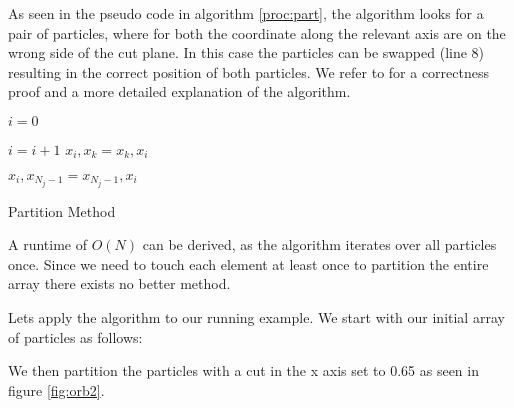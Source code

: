 \documentclass[]{article}
\begin{document}
As seen in the pseudo code in algorithm \ref{proc:part}, the algorithm looks for a pair of particles, where for both the coordinate along the relevant axis are  on the wrong side of the cut plane. In this case the particles can be swapped (line 8) resulting in the correct position of both particles. We refer to \cite{algorithms} for a correctness proof and a more detailed explanation of the algorithm. 

\algnewcommand{}


\begin{algorithm}[H]
	\begin{algorithmic}[1]
		\State $i = 0$
		
			\State $i = i + 1$
		\EndWhile
		\State $x_{i}, x_{k} = x_{k}, x_{i}$
		\EndIf
		\EndFor
		
		\State $ x_{i}, x_{N_j-1} = x_{N_j-1}, x_{i}$
		\EndProcedure
	\end{algorithmic}
\caption{Partition Method}
\label{proc:part}
\end{algorithm}

A runtime of $O(N)$ can be derived, as the algorithm iterates over all particles once. Since we need to touch each element at least once to partition the entire array there exists no better method.

Lets apply the algorithm to our running example. We start with our initial array of particles as follows:

\begin{figure}[H]
	\begin{center}
	\end{center}
\end{figure}

We then partition the particles with a cut in the x axis set to 0.65 as seen in figure \ref{fig:orb2}.

\begin{figure}[H]
	\begin{center}
	\end{center}
\end{figure}
\end{document}
